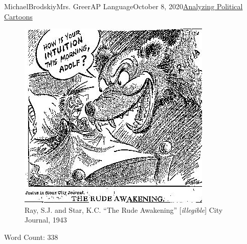 \documentclass[12pt,letterpaper]{article}
\begin{document}
\begin{mla}{Michael}{Brodskiy}{Mrs. Greer}{AP Language}{October 8, 2020}{\underline{Analyzing Political Cartoons}}
\begin{justifying}
    \begin{figure}[h]
      \centering
      \includegraphics[width=.6\textwidth]{../Figures/Stalingrad.jpg}
      \caption{Ray, S.J. and Star, K.C. ``The Rude Awakening'' [\textit{illegible}] City Journal, 1943}
      \label{fig:1}
    \end{figure}


\end{justifying}
\centering Word Count: 338

\end{mla}
\end{document}
